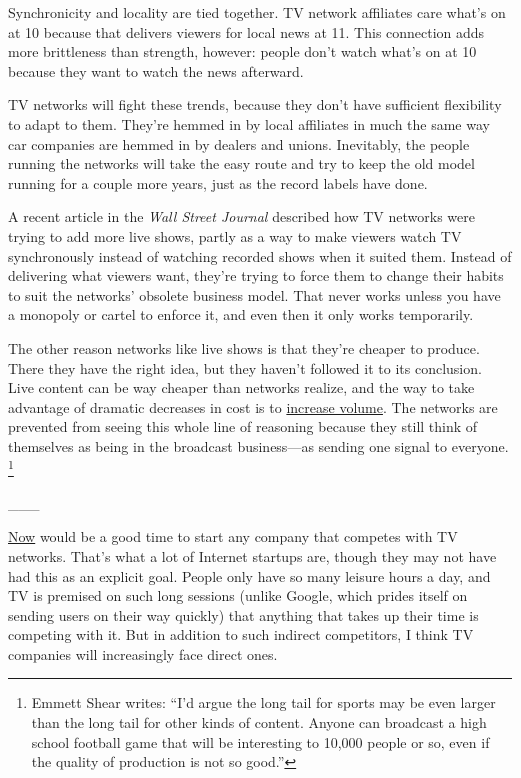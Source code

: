 Synchronicity and locality are tied together. TV network affiliates care
what's on at 10 because that delivers viewers for local news at 11. This
connection adds more brittleness than strength, however: people don't
watch what's on at 10 because they want to watch the news afterward.

TV networks will fight these trends, because they don't have sufficient
flexibility to adapt to them. They're hemmed in by local affiliates in
much the same way car companies are hemmed in by dealers and unions.
Inevitably, the people running the networks will take the easy route and
try to keep the old model running for a couple more years, just as the
record labels have done.

A recent article in the \emph{Wall Street Journal} described how TV
networks were trying to add more live shows, partly as a way to make
viewers watch TV synchronously instead of watching recorded shows when
it suited them. Instead of delivering what viewers want, they're trying
to force them to change their habits to suit the networks' obsolete
business model. That never works unless you have a monopoly or cartel to
enforce it, and even then it only works temporarily.

The other reason networks like live shows is that they're cheaper to
produce. There they have the right idea, but they haven't followed it to
its conclusion. Live content can be way cheaper than networks realize,
and the way to take advantage of dramatic decreases in cost is to
\href{http://justin.tv}{increase volume}. The networks are prevented
from seeing this whole line of reasoning because they still think of
themselves as being in the broadcast business---as sending one signal to
everyone. \footnote{Emmett Shear writes: ``I'd argue the long tail for sports may be
even larger than the long tail for other kinds of content. Anyone can
broadcast a high school football game that will be interesting to 10,000
people or so, even if the quality of production is not so good.''}

\_\_\_

\href{badeconomy.html}{Now} would be a good time to start any company
that competes with TV networks. That's what a lot of Internet startups
are, though they may not have had this as an explicit goal. People only
have so many leisure hours a day, and TV is premised on such long
sessions (unlike Google, which prides itself on sending users on their
way quickly) that anything that takes up their time is competing with
it. But in addition to such indirect competitors, I think TV companies
will increasingly face direct ones.

